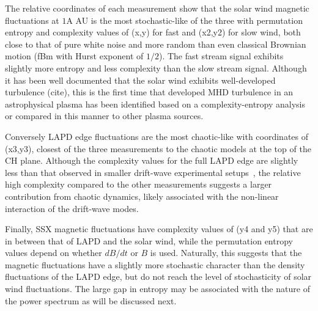 \documentclass[aps,pre,twocolumn,secnumarabic,nobalancelastpage,amsmath,amssymb,
nofootinbib]{revtex4-1}
\begin{document}
The relative coordinates of each measurement show that the solar wind magnetic fluctuations at $1$A AU is the most stochastic-like of the three with permutation entropy and complexity values of (x,y) for fast and (x2,y2) for slow wind, both close to that of pure white noise and more random than even classical Brownian motion (fBm with Hurst exponent of $1/2$). The fast stream signal exhibits slightly more entropy and less complexity than the slow stream signal. Although it has been well documented that the solar wind exhibits well-developed turbulence (cite), this is the first time that developed MHD turbulence in an astrophysical plasma has been identified based on a complexity-entropy analysis or compared in this manner to other plasma sources.

Conversely LAPD edge fluctuations are the most chaotic-like with coordinates of (x3,y3), closest of the three measurements to the chaotic models at the top of the CH plane. Although the complexity values for the full LAPD edge are slightly less than that observed in smaller drift-wave experimental setups~\cite{maggs2013}, the relative high complexity compared to the other measurements suggests a larger contribution from chaotic dynamics, likely associated with the non-linear interaction of the drift-wave modes. 

Finally, SSX magnetic fluctuations have complexity values of (y4 and y5) that are in between that of LAPD and the solar wind, while the permutation entropy values depend on whether $dB/dt$ or $B$ is used. Naturally, this suggests that the magnetic fluctuations have a slightly more stochastic character than the density fluctuations of the LAPD edge, but do not reach the level of stochasticity of solar wind fluctuations. The large gap in entropy may be associated with the nature of the power spectrum as will be discussed next.
\end{document}
